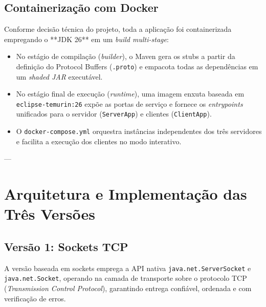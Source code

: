 \documentclass[12pt,a4paper]{article}
\begin{document}
\subsection{Containerização com Docker}
Conforme decisão técnica do projeto, toda a aplicação foi containerizada empregando o **JDK 26** em um \textit{build multi-stage}:
\begin{itemize}
    \item No estágio de compilação (\textit{builder}), o Maven gera os stubs a partir da definição do Protocol Buffers (\texttt{.proto}) e empacota todas as dependências em um \textit{shaded JAR} executável.
    \item No estágio final de execução (\textit{runtime}), uma imagem enxuta baseada em \texttt{eclipse-temurin:26} expõe as portas de serviço e fornece os \textit{entrypoints} unificados para o servidor (\texttt{ServerApp}) e clientes (\texttt{ClientApp}).
    \item O \texttt{docker-compose.yml} orquestra instâncias independentes dos três servidores e facilita a execução dos clientes no modo interativo.
\end{itemize}

---

\section{Arquitetura e Implementação das Três Versões}

\subsection{Versão 1: Sockets TCP}
A versão baseada em sockets emprega a API nativa \texttt{java.net.ServerSocket} e \texttt{java.net.Socket}, operando na camada de transporte sobre o protocolo TCP (\textit{Transmission Control Protocol}), garantindo entrega confiável, ordenada e com verificação de erros.
\end{document}
